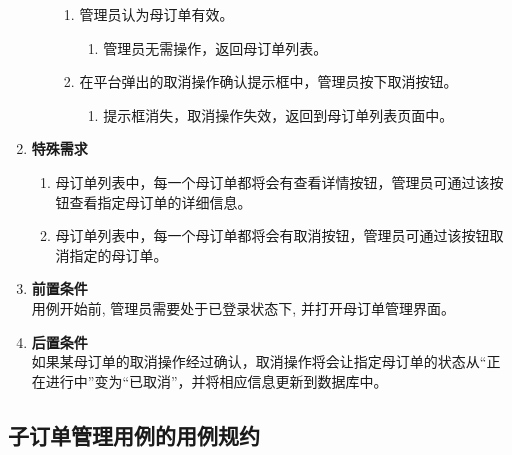 \begin{enumerate}
\begin{enumerate}
        \begin{enumerate}
            \item 管理员认为母订单有效。
            \begin{enumerate}
                \item 管理员无需操作，返回母订单列表。
            \end{enumerate}
            \item 在平台弹出的取消操作确认提示框中，管理员按下取消按钮。
            \begin{enumerate}
                \item 提示框消失，取消操作失效，返回到母订单列表页面中。
            \end{enumerate}
        \end{enumerate}
    \end{enumerate}
    \item \textbf{特殊需求}
    \begin{enumerate}
        \item 母订单列表中，每一个母订单都将会有查看详情按钮，管理员可通过该按钮查看指定母订单的详细信息。
        \item 母订单列表中，每一个母订单都将会有取消按钮，管理员可通过该按钮取消指定的母订单。
    \end{enumerate}
    \item \textbf{前置条件} \\ 用例开始前, 管理员需要处于已登录状态下, 并打开母订单管理界面。
    \item \textbf{后置条件} \\ 如果某母订单的取消操作经过确认，取消操作将会让指定母订单的状态从“正在进行中”变为“已取消”，并将相应信息更新到数据库中。
\end{enumerate}



\subsection{子订单管理用例的用例规约}

